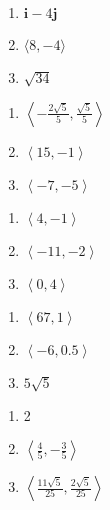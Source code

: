 \begin{multicols}{3}
\begin{enumerate}
	\item $\mathbf{i}-4\mathbf{j}$
    \item $\langle 8, -4 \rangle$
    \item $\sqrt{34}$
\end{enumerate}	\setcounter{Review}{\value{enumi}}
\end{multicols}
\begin{multicols}{3}
\begin{enumerate}		\setcounter{enumi}{\value{Review}}
    \item $\left\langle -\frac{2\sqrt{5}}{5}, \frac{\sqrt{5}}{5}\right\rangle$
    \item $\left\langle 15, -1\right\rangle$	
    \item $\left\langle -7, -5 \right\rangle$	
\end{enumerate}	\setcounter{Review}{\value{enumi}}
\end{multicols}
\begin{multicols}{3}
\begin{enumerate}		\setcounter{enumi}{\value{Review}}
    \item $\left\langle 4, -1 \right\rangle$
    \item $\left\langle -11, -2 \right\rangle$
    \item $\left\langle 0, 4 \right\rangle$
\end{enumerate}	\setcounter{Review}{\value{enumi}}
\end{multicols}
\begin{multicols}{3}
\begin{enumerate}		\setcounter{enumi}{\value{Review}}
    \item $\left\langle 67, 1 \right\rangle$
    \item $\left\langle -6, 0.5 \right\rangle$
    \item $5\sqrt{5}$
\end{enumerate}	\setcounter{Review}{\value{enumi}}
\end{multicols}
\begin{multicols}{3}
\begin{enumerate}		\setcounter{enumi}{\value{Review}}
    \item 2	
    \item $\left\langle \frac{4}{5}, -\frac{3}{5}\right\rangle$	
    \item $\left\langle \frac{11\sqrt{5}}{25}, \frac{2\sqrt{5}}{25}\right\rangle$
\end{enumerate}	\setcounter{Review}{\value{enumi}}
\end{multicols}
